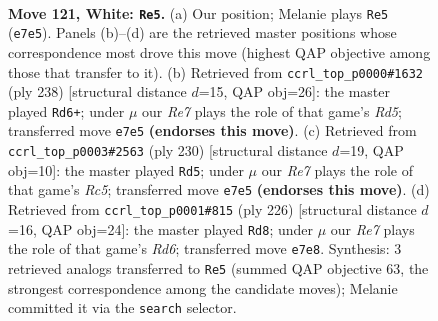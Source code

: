\documentclass[11pt]{article}
\begin{document}
\clearpage

\begin{figure}[p]\centering
\begin{subfigure}{0.46\textwidth}\centering
\resizebox{\linewidth}{!}{%
\newchessgame
\chessboard[
  setfen={8/4R1p1/1N4k1/5p1p/7P/6PK/r7/8 w - - 0 121},
  showmover=false,
  pgfstyle=straightmove, color=movearrow, markmove={e7-e5}
]}
\caption{}
\end{subfigure}\hfill
\begin{subfigure}{0.46\textwidth}\centering
\resizebox{\linewidth}{!}{%
\newchessgame
\chessboard[
  setfen={8/8/6k1/3R1p1p/5P1P/6PK/r7/8 w - - 85 120},
  showmover=false,
  pgfstyle=straightmove, color=movearrow, markmove={d5-d6}
]}
\caption{}
\end{subfigure}
\\[4pt]
\begin{subfigure}{0.46\textwidth}\centering
\resizebox{\linewidth}{!}{%
\newchessgame
\chessboard[
  setfen={8/8/r5kp/2R4p/7P/5KP1/8/8 w - - 2 116},
  showmover=false,
  pgfstyle=straightmove, color=movearrow, markmove={c5-d5}
]}
\caption{}
\end{subfigure}\hfill
\begin{subfigure}{0.46\textwidth}\centering
\resizebox{\linewidth}{!}{%
\newchessgame
\chessboard[
  setfen={8/5pk1/3R1p2/7P/6P1/5PK1/r7/8 w - - 61 114},
  showmover=false,
  pgfstyle=straightmove, color=movearrow, markmove={d6-d8}
]}
\caption{}
\end{subfigure}
\caption{\textbf{Move 121, White: \texttt{Re5}.} (a) Our position; Melanie plays \texttt{Re5} (\texttt{e7e5}). Panels (b)--(d) are the retrieved master positions whose correspondence most drove this move (highest QAP objective among those that transfer to it). (b) Retrieved from \texttt{ccrl\_top\_p0000\#1632} (ply 238) [structural distance $d$=15, QAP obj=26]: the master played \texttt{Rd6+}; under $\mu$ our \emph{Re7} plays the role of that game's \emph{Rd5}; transferred move \texttt{e7e5} \textbf{(endorses this move)}. (c) Retrieved from \texttt{ccrl\_top\_p0003\#2563} (ply 230) [structural distance $d$=19, QAP obj=10]: the master played \texttt{Rd5}; under $\mu$ our \emph{Re7} plays the role of that game's \emph{Rc5}; transferred move \texttt{e7e5} \textbf{(endorses this move)}. (d) Retrieved from \texttt{ccrl\_top\_p0001\#815} (ply 226) [structural distance $d$=16, QAP obj=24]: the master played \texttt{Rd8}; under $\mu$ our \emph{Re7} plays the role of that game's \emph{Rd6}; transferred move \texttt{e7e8}. Synthesis: 3 retrieved analogs transferred to \texttt{Re5} (summed QAP objective 63, the strongest correspondence among the candidate moves); Melanie committed it via the \texttt{search} selector.}
\label{fig:thought-m240}
\end{figure}
\end{document}
